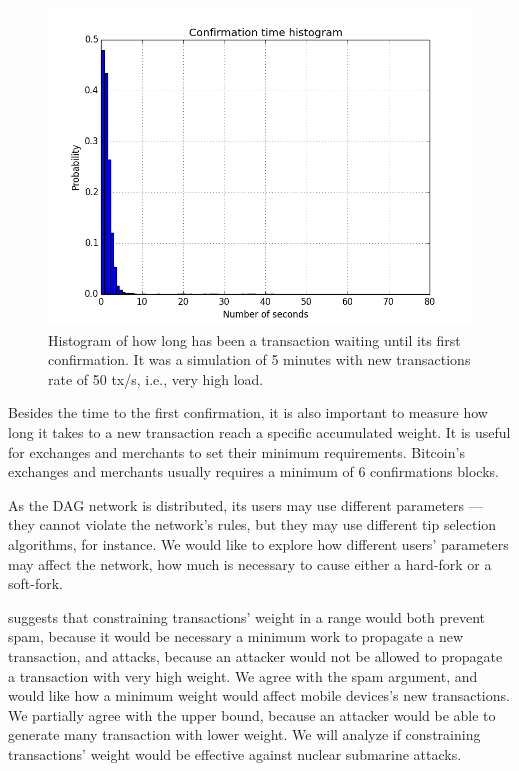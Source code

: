 \begin{figure}[ht]
\centering\includegraphics[width=\textwidth]{./images01/fig-tangle-hist-2.png}
\caption{Histogram of how long has been a transaction waiting until its first confirmation. It was a simulation of 5 minutes with new transactions rate of 50 tx/s, i.e., very high load.\label{fig-tangle-hist-2}}
\end{figure}


Besides the time to the first confirmation, it is also important to measure how long it takes to a new transaction reach a specific accumulated weight. It is useful for exchanges and merchants to set their minimum requirements. Bitcoin's exchanges and merchants usually requires a minimum of 6 confirmations blocks.

As the DAG network is distributed, its users may use different parameters --- they cannot violate the network's rules, but they may use different tip selection algorithms, for instance. We would like to explore how different users' parameters may affect the network, how much is necessary to cause either a hard-fork or a soft-fork.

\cite{tangle2016} suggests that constraining transactions' weight in a range would both prevent spam, because it would be necessary a minimum work to propagate a new transaction, and attacks, because an attacker would not be allowed to propagate a transaction with very high weight. We agree with the spam argument, and would like how a minimum weight would affect mobile devices's new transactions. We partially agree with the upper bound, because an attacker would be able to generate many transaction with lower weight. We will analyze if constraining transactions' weight would be effective against nuclear submarine attacks.

